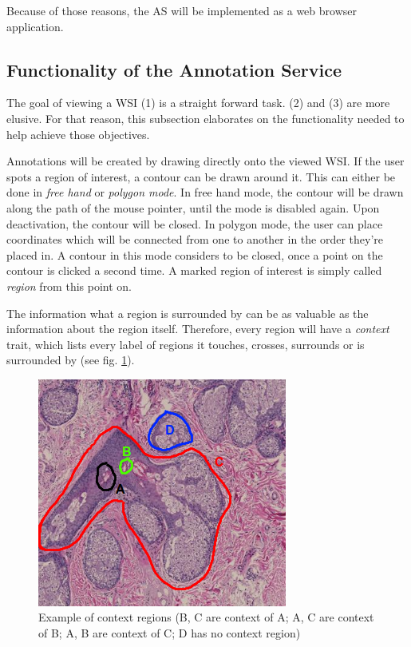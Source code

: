 Because of those reasons, the AS will be implemented as a web browser application. 


\subsection{Functionality of the Annotation Service}
The goal of viewing a WSI (1) is a straight forward task. (2) and (3) are more elusive. For that reason, this subsection elaborates on the functionality needed to help achieve those objectives.

Annotations will be created by drawing directly onto the viewed WSI. If the user spots a region of interest, a contour can be drawn around it. This can  either be done in \emph{free hand} or \emph{polygon mode}. In free hand mode, the contour will be drawn along the path of the mouse pointer, until the mode is disabled again. Upon deactivation, the contour will be closed. In polygon mode, the user can place coordinates which will be connected from one to another in the order they're placed in. A contour in this mode considers to be closed, once a point on the contour is clicked a second time. A marked region of interest is simply called \emph{region} from this point on.

The information what a region is surrounded by can be as valuable as the information about the region itself\cite{Bankman00}. Therefore, every region will have a \emph{context} trait, which lists every label of regions it touches, crosses, surrounds or is surrounded by (see fig. \ref{fig4_contextregions}).

\begin{figure}[H]
	\begin{center}
		\includegraphics[scale=0.5]{img/contextregions.png}
		\caption{Example of context regions (B, C are context of A; A, C are context of B; A, B are context of C; D has no context region)}
		\label{fig4_contextregions}
	\end{center}
\end{figure}

